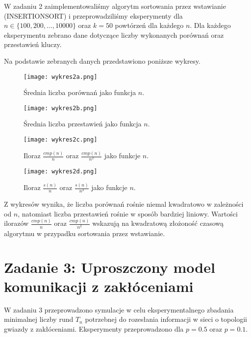 \documentclass{article}
\begin{document}
W zadaniu 2 zaimplementowaliśmy algorytm sortowania przez wstawianie (INSERTIONSORT) i przeprowadziliśmy eksperymenty dla \(n \in \{100, 200, \dots, 10 000\}\) oraz \(k = 50\) powtórzeń dla każdego \(n\). Dla każdego eksperymentu zebrano dane dotyczące liczby wykonanych porównań oraz przestawień kluczy.

Na podstawie zebranych danych przedstawiono poniższe wykresy.

\begin{figure}[ht]
    \centering
    \texttt{[image: wykres2a.png]}
    \caption{Średnia liczba porównań jako funkcja \(n\).}
    \label{fig:wykres2a}
\end{figure}

\begin{figure}[ht]
    \centering
    \texttt{[image: wykres2b.png]}
    \caption{Średnia liczba przestawień jako funkcja \(n\).}
    \label{fig:wykres2b}
\end{figure}

\begin{figure}[ht]
    \centering
    \texttt{[image: wykres2c.png]}
    \caption{Iloraz \(\frac{cmp(n)}{n}\) oraz \(\frac{cmp(n)}{n^2}\) jako funkcje \(n\).}
    \label{fig:wykres2c}
\end{figure}

\begin{figure}[ht]
    \centering
    \texttt{[image: wykres2d.png]}
    \caption{Iloraz \(\frac{s(n)}{n}\) oraz \(\frac{s(n)}{n^2}\) jako funkcje \(n\).}
    \label{fig:wykres2d}
\end{figure}

Z wykresów wynika, że liczba porównań rośnie niemal kwadratowo w zależności od \(n\), natomiast liczba przestawień rośnie w sposób bardziej liniowy. Wartości ilorazów \(\frac{cmp(n)}{n}\) oraz \(\frac{cmp(n)}{n^2}\) wskazują na kwadratową złożoność czasową algorytmu w przypadku sortowania przez wstawianie.

\section*{Zadanie 3: Uproszczony model komunikacji z zakłóceniami}

W zadaniu 3 przeprowadzono symulacje w celu eksperymentalnego zbadania minimalnej liczby rund \(T_n\) potrzebnej do rozesłania informacji w sieci o topologii gwiazdy z zakłóceniami. Eksperymenty przeprowadzono dla \(p = 0.5\) oraz \(p = 0.1\).
\end{document}
